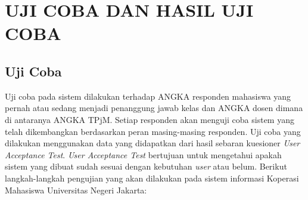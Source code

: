 
\chapter{UJI COBA DAN HASIL UJI COBA}

\section{Uji Coba}
	Uji coba pada sistem dilakukan terhadap ANGKA responden mahasiswa yang pernah atau sedang menjadi penanggung jawab kelas dan ANGKA dosen dimana di antaranya ANGKA TPjM. Setiap responden akan menguji coba sistem yang telah dikembangkan berdasarkan peran masing-masing responden. Uji coba yang dilakukan menggunakan data yang didapatkan dari hasil sebaran kuesioner \textit{User Acceptance Test}. \textit{User Acceptance Test} bertujuan untuk mengetahui apakah sistem yang dibuat sudah sesuai dengan kebutuhan \textit{user} atau belum. Berikut langkah-langkah pengujian yang akan dilakukan pada sistem informasi Koperasi Mahasiswa Universitas Negeri Jakarta:
